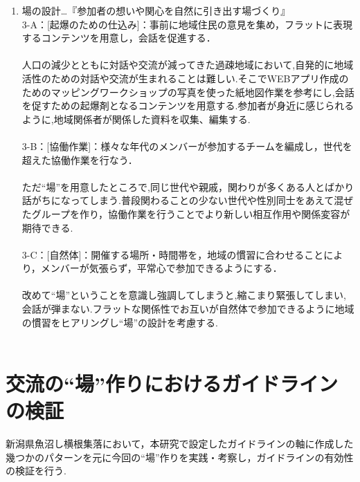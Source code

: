 \documentclass[a4paper]{jsarticle}
\begin{document}
\begin{enumerate}
\item 場の設計…『参加者の想いや関心を自然に引き出す場づくり』\\
3-A：[起爆のための仕込み]：事前に地域住民の意見を集め，フラットに表現するコンテンツを用意し，会話を促進する．\\\\

人口の減少とともに対話や交流が減ってきた過疎地域において,自発的に地域活性のための対話や交流が生まれることは難しい.そこでWEBアプリ作成のためのマッピングワークショップの写真を使った紙地図作業を参考にし,会話を促すための起爆剤となるコンテンツを用意する.参加者が身近に感じられるように,地域関係者が関係した資料を収集、編集する.\\\\

3-B：[協働作業]：様々な年代のメンバーが参加するチームを編成し，世代を超えた協働作業を行なう．\\\\
ただ“場”を用意したところで,同じ世代や親戚，関わりが多くある人とばかり話がちになってしまう.普段関わることの少ない世代や性別同士をあえて混ぜたグループを作り，協働作業を行うことでより新しい相互作用や関係変容が期待できる.\\\\
3-C：[自然体]：開催する場所・時間帯を，地域の慣習に合わせることにより，メンバーが気張らず，平常心で参加できるようにする．\\\\
改めて“場”ということを意識し強調してしまうと,縮こまり緊張してしまい,会話が弾まない.フラットな関係性でお互いが自然体で参加できるように地域の慣習をヒアリングし“場”の設計を考慮する.
\\\\
\end{enumerate}

\newpage
\section{交流の“場”作りにおけるガイドラインの検証}
新潟県魚沼し横根集落において，本研究で設定したガイドラインの軸に作成した幾つかのパターンを元に今回の“場”作りを実践・考察し，ガイドラインの有効性の検証を行う.
\end{document}
